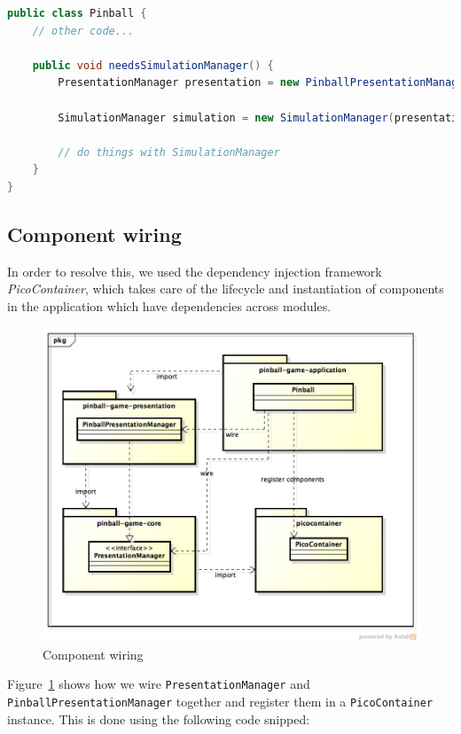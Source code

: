 \documentclass[fontsize=12pt,
               paper=a4,
               twoside=false,
               parskip=half,
               ]{scrartcl}
\begin{document}
\begin{minipage}[]{\linewidth}
\begin{lstlisting}[language=Java,label=lst:no_dependency_injection,caption={no dependency injection}]
public class Pinball {
	// other code...

	public void needsSimulationManager() {
		PresentationManager presentation = new PinballPresentationManager();

		SimulationManager simulation = new SimulationManager(presentation);

		// do things with SimulationManager
	}
}
\end{lstlisting}
\end{minipage}

\subsection{Component wiring}

In order to resolve this, we used the dependency injection framework \emph{PicoContainer}, which takes care of the lifecycle and instantiation of components in the application which have dependencies across modules.

\begin{figure}[H]
	\centering
	\includegraphics[width=15.5cm]{./img/dependency-injection2.png}
	\caption[Component wiring]{Component wiring}
	\label{fig:dependency_injection2}
\end{figure}

Figure~\ref{fig:dependency_injection2} shows how we wire \texttt{PresentationManager} and \texttt{PinballPresentationManager} together and register them in a \texttt{PicoContainer} instance. This is done using the following code snipped:
\end{document}
